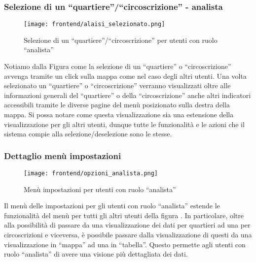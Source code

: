     \subsubsection{Selezione di un ``quartiere''/``circoscrizione'' - analista}
        \begin{figure}[H]
            \centering
            \texttt{[image: frontend/alaisi\_selezionato.png]}
            \caption{Selezione di un ``quartiere''/``circoscrizione'' per utenti con ruolo ``analista''}
            \label{fig:frontend-analista-quartiere}
        \end{figure}
        Notiamo dalla Figura  come la selezione di un ``quartiere'' o ``circoscrizione'' avvenga tramite un click sulla mappa come nel caso degli altri utenti. Una volta selezionato un ``quartiere'' o ``circoscrizione'' verranno visualizzati oltre alle informazioni generali del ``quartiere'' o della ``circoscrizione'' anche altri indicatori accessibili tramite le diverse pagine del menù posizionato sulla destra della mappa.\newline
        Si possa notare come questa visualizzazione sia una estensione della visualizzazione per gli altri utenti, dunque tutte le funzionalità e le azioni che il sistema compie alla selezione/deselezione sono le stesse.
    \subsubsection{Dettaglio menù impostazioni}
        \begin{figure}[H]
            \centering
            \texttt{[image: frontend/opzioni\_analista.png]}
            \caption{Menù impostazioni per utenti con ruolo ``analista''}
            \label{fig:frontend-settings-analista}
        \end{figure}
        Il menù delle impostazioni per gli utenti con ruolo ``analista'' estende le funzionalità del menù per tutti gli altri utenti della figura . In particolare, oltre alla possibilità di passare da una visualizzazione dei dati per quartieri ad una per circoscrizioni e viceversa, è possibile passare dalla visualizzazione di questi da una visualizzazione in ``mappa'' ad una in ``tabella''. Questo permette agli utenti con ruolo ``analista'' di avere una visione più dettagliata dei dati.
